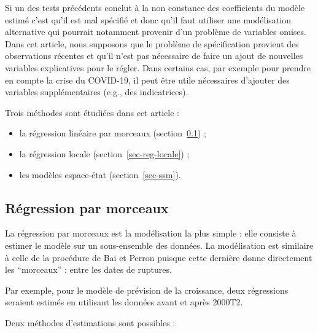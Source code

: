 \documentclass[
  a4paper,
  DIV=11,
  numbers=noendperiod,
  french]{scrartcl}
\newcommand\1{{\mathds 1}}
\theoremstyle{remark}
\begin{document}
Si un des tests précédents conclut à la non constance des coefficients
du modèle estimé c'est qu'il est mal spécifié et donc qu'il faut
utiliser une modélisation alternative qui pourrait notamment provenir
d'un problème de variables omises. Dans cet article, nous supposons que
le problème de spécification provient des observations récentes et qu'il
n'est pas nécessaire de faire un ajout de nouvelles variables
explicatives pour le régler. Dans certains cas, par exemple pour prendre
en compte la crise du COVID-19, il peut être utile nécessaires d'ajouter
des variables supplémentaires (e.g., des indicatrices).

Trois méthodes sont étudiées dans cet article :

\begin{itemize}
\item
  la régression linéaire par morceaux (section~\ref{sec-reg-morceaux}) ;
\item
  la régression locale (section~\ref{sec-reg-locale}) ;
\item
  les modèles espace-état (section~\ref{sec-ssm}).
\end{itemize}

\subsection{Régression par morceaux}\label{sec-reg-morceaux}

La régression par morceaux est la modélisation la plus simple : elle
consiste à estimer le modèle sur un sous-ensemble des données. La
modélisation est similaire à celle de la procédure de Bai et Perron
puisque cette dernière donne directement les ``morceaux'' : entre les
dates de ruptures.

Par exemple, pour le modèle de prévision de la croissance, deux
régressions seraient estimés en utilisant les données avant et après
2000T2.

Deux méthodes d'estimations sont possibles :
\end{document}

